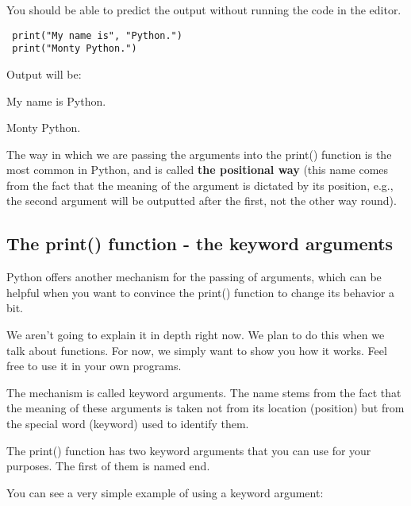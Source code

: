 \documentclass[a4paper,10pt]{article}
\begin{document}
You should be able to predict the output without running the code in the editor.
\begin{verbatim}
 print("My name is", "Python.")
 print("Monty Python.")
\end{verbatim}




Output will be:
\newline


{\selectfont My name is Python.


Monty Python.}
\newline



The way in which we are passing the arguments into the {\selectfont print()} function is the most common in Python, and is called \textbf{the positional way} (this name comes from the fact that the meaning of the argument is dictated by its position, e.g., the second argument will be outputted after the first, not the other way round).
\newline

\subsection{The print() function - the keyword arguments}
Python offers another mechanism for the passing of arguments, which can be helpful when you want to convince the {\selectfont print()} function to change its behavior a bit.
\newline

We aren't going to explain it in depth right now. We plan to do this when we talk about functions. For now, we simply want to show you how it works. Feel free to use it in your own programs.
\newline

The mechanism is called keyword arguments. The name stems from the fact that the meaning of these arguments is taken not from its location (position) but from the special word (keyword) used to identify them.
\newline

The {\selectfont print()} function has two keyword arguments that you can use for your purposes. The first of them is named {\selectfont end}.
\newline

You can see a very simple example of using a keyword argument:
\newline
\end{document}
